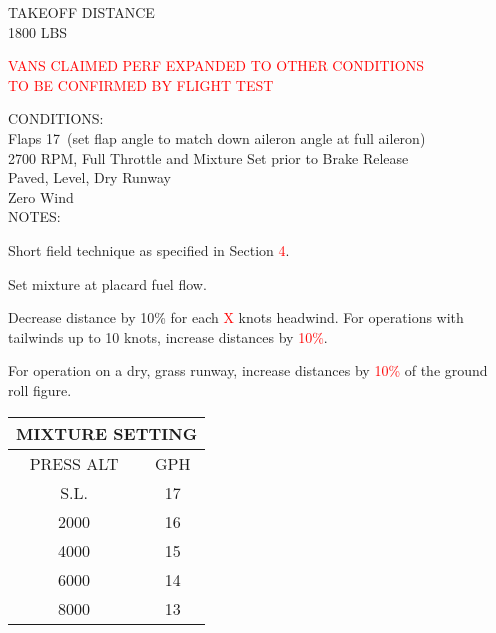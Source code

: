 \begin{sidewaysfigure}[t]
\begin{center}
\begin{perfhdr}TAKEOFF DISTANCE\\
1800 LBS
\end{perfhdr}
\Large
\textcolor{red}{VANS CLAIMED PERF EXPANDED TO OTHER CONDITIONS}\vspace{1ex}\\
\textcolor{red}{TO BE CONFIRMED BY FLIGHT TEST}\normalsize \vspace{5ex}\\

\begin{minipage}{7.5in}
  \begin{flushleft}
    CONDITIONS:\\
    Flaps 17\textdegree \ (set flap angle to match down aileron angle at full aileron)\\
    2700 RPM, Full Throttle and Mixture Set prior to Brake Release\\
    Paved, Level, Dry Runway\\
    Zero Wind\\
\vspace{\perfnoteskip}
    NOTES:
    \begin{enumerate*}
      \item Short field technique as specified in Section \textcolor{red}{4}.
      \item Set mixture at placard fuel flow.
      \item Decrease distance by 10\% for each \textcolor{red}{X} knots headwind.  For operations with tailwinds up to 10
      knots, increase distances by \textcolor{red}{10\%}.
      \item For operation on a dry, grass runway, increase distances by \textcolor{red}{10\%} of the ground roll figure.
      \end{enumerate*}
    \end{flushleft}
  \end{minipage}
\hfill
\begin{minipage}{1.5in}
  \begin{tabular}{|c|c|}
    \hline
    \multicolumn{2}{|c|}{MIXTURE SETTING}\\
    \hline
    PRESS ALT&GPH\\
    \hline
    S.L.&17\\
    2000&16\\
    4000&15\\
    6000&14\\
    8000&13\\
    \hline
    \end{tabular}
  \end{minipage}
\\


\end{center}
\end{sidewaysfigure}
